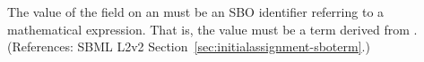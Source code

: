 The value of the  field on an \InitialAssignment must be an
SBO identifier referring to a mathematical expression.  That is, the value
must be a term derived from \sbomathformula.  (References: SBML L2v2
Section~\ref{sec:initialassignment-sboterm}.)
